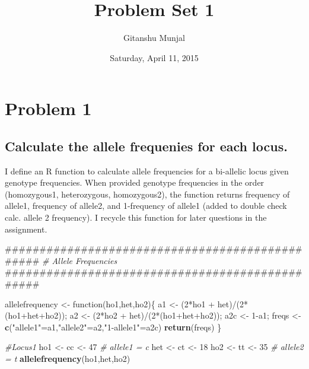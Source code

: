 \documentclass[]{article}
\title{Problem Set 1}
\author{Gitanshu Munjal}
\date{Saturday, April 11, 2015}
\newenvironment{Shaded}{\begin{snugshade}}{\end{snugshade}}
\newcommand{\KeywordTok}[1]{\textcolor[rgb]{0.13,0.29,0.53}{\textbf{{#1}}}}
\newcommand{\DecValTok}[1]{\textcolor[rgb]{0.00,0.00,0.81}{{#1}}}
\newcommand{\StringTok}[1]{\textcolor[rgb]{0.31,0.60,0.02}{{#1}}}
\newcommand{\CommentTok}[1]{\textcolor[rgb]{0.56,0.35,0.01}{\textit{{#1}}}}
\newcommand{\NormalTok}[1]{{#1}}
\begin{document}
\maketitle


\section{Problem 1}\label{problem-1}

\subsection{Calculate the allele frequenies for each
locus.}\label{calculate-the-allele-frequenies-for-each-locus.}

I define an R function to calculate allele frequencies for a bi-allelic
locus given genotype frequencies. When provided genotype frequencies in
the order (homozygous1, heterozygous, homozygous2), the function returns
frequency of allele1, frequency of allele2, and 1-frequency of allele1
(added to double check calc. allele 2 frequency). I recycle this
function for later questions in the assignment.

\begin{Shaded}
\begin{Highlighting}[]
\NormalTok{################################################}
\CommentTok{# Allele Frequencies}
\NormalTok{################################################}

\NormalTok{allelefrequency <-}\StringTok{ }\NormalTok{function(ho1,het,ho2)\{}
                                  \NormalTok{a1 <-}\StringTok{ }\NormalTok{(}\DecValTok{2}\NormalTok{*ho1 +}\StringTok{ }\NormalTok{het)/(}\DecValTok{2}\NormalTok{*(ho1+het+ho2));}
                                  \NormalTok{a2 <-}\StringTok{ }\NormalTok{(}\DecValTok{2}\NormalTok{*ho2 +}\StringTok{ }\NormalTok{het)/(}\DecValTok{2}\NormalTok{*(ho1+het+ho2));}
                                  \NormalTok{a2c <-}\StringTok{ }\DecValTok{1}\NormalTok{-a1;}
                                  \NormalTok{freqs <-}\StringTok{ }\KeywordTok{c}\NormalTok{(}\StringTok{"allele1"}\NormalTok{=a1,}\StringTok{"allele2"}\NormalTok{=a2,}\StringTok{"1-allele1"}\NormalTok{=a2c)}
                                  \KeywordTok{return}\NormalTok{(freqs)}
                   \NormalTok{\}}
  

\CommentTok{#Locus1}
\NormalTok{ho1 <-}\StringTok{ }\NormalTok{cc <-}\StringTok{ }\DecValTok{47}     \CommentTok{# allele1 = c}
\NormalTok{het <-}\StringTok{ }\NormalTok{ct <-}\StringTok{ }\DecValTok{18}
\NormalTok{ho2 <-}\StringTok{ }\NormalTok{tt <-}\StringTok{ }\DecValTok{35}     \CommentTok{# allele2 = t}
\KeywordTok{allelefrequency}\NormalTok{(ho1,het,ho2)}
\end{Highlighting}
\end{Shaded}
\end{document}
